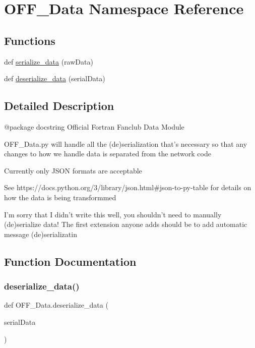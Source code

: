\hypertarget{namespace_o_f_f___data}{}\section{O\+F\+F\+\_\+\+Data Namespace Reference}
\label{namespace_o_f_f___data}
\subsection*{Functions}
\begin{DoxyCompactItemize}
\item 
def \hyperlink{namespace_o_f_f___data_a826cab3cf308a0e882e8386544f49f7b}{serialize\+\_\+data} (raw\+Data)
\item 
def \hyperlink{namespace_o_f_f___data_a59279364cc977ebb5b368377494c10ef}{deserialize\+\_\+data} (serial\+Data)
\end{DoxyCompactItemize}


\subsection{Detailed Description}
\begin{DoxyVerb}@package docstring
Official Fortran Fanclub Data Module

OFF_Data.py will handle all the (de)serialization that's necessary so that any
changes to how we handle data is separated from the network code

Currently only JSON formats are acceptable

See https://docs.python.org/3/library/json.html#json-to-py-table for details
on how the data is being transformmed

I'm sorry that I didn't write this well, you shouldn't need to manually
(de)serialize data! The first extension anyone adds should be to add automatic
message (de)serializatin
\end{DoxyVerb}
 

\subsection{Function Documentation}
\mbox{\label{namespace_o_f_f___data_a59279364cc977ebb5b368377494c10ef}} 
\subsubsection{\texorpdfstring{deserialize\+\_\+data()}{deserialize\_data()}}
{\footnotesize\ttfamily def O\+F\+F\+\_\+\+Data.\+deserialize\+\_\+data (\begin{DoxyParamCaption}\item[{}]{serial\+Data }\end{DoxyParamCaption})}

